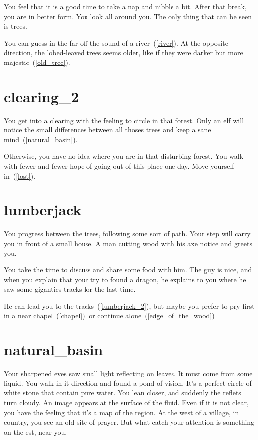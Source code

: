 You feel that it is a good time to take a nap and nibble a bit. After that
break, you are in better form. You look all around you. The only thing that can
be seen is trees.

You can guess in the far-off the sound of a river~(\ref{river}). At the opposite
direction, the lobed-leaved trees seems older, like if they were darker but more
majestic~(\ref{old_tree}).

\section{clearing_2}

You get into a clearing with the feeling to circle in that forest. Only an elf
will notice the small differences between all thoses trees and keep a sane
mind~(\ref{natural_basin}).

Otherwise, you have no idea where you are in that disturbing forest. You walk
with fewer and fewer hope of going out of this place one day. Move yourself
in~(\ref{lost}).

\section{lumberjack}

You progress between the trees, following some sort of path. Your step will
carry you in front of a small house. A man cutting wood with his axe notice and
greets you.

You take the time to discuss and share some food with him. The guy is
nice, and when you explain that your try to found a dragon, he explains to you
where he saw some gigantics tracks for the last time.

He can lead you to the tracks~(\ref{lumberjack_2}), but maybe you prefer to pry
first in a near chapel~(\ref{chapel}), or continue alone~(\ref{edge_of_the_wood})

\section{natural_basin}

Your sharpened eyes saw small light reflecting on leaves. It must come from some
liquid. You walk in it direction and found a pond of vision. It's a perfect
circle of white stone that contain pure water. You lean closer, and suddenly the
reflets turn cloudy. An image appears at the surface of the fluid. Even if it
is not clear, you have the feeling that it's a map of the region. At the west of
a village, in country, you see an old site of prayer. But what catch your
attention is something on the est, near you.

